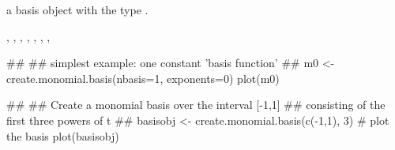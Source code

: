 \begin{Value}
a basis object with the type .
\end{Value}
\begin{SeeAlso}\relax
{}, 
, 
, 
, 
, 
, 
, 
\end{SeeAlso}
\begin{Examples}
\begin{ExampleCode}
##
## simplest example: one constant 'basis function' 
##
m0 <- create.monomial.basis(nbasis=1, exponents=0)
plot(m0)

##
## Create a monomial basis over the interval [-1,1]
##  consisting of the first three powers of t
##
basisobj <- create.monomial.basis(c(-1,1), 3)
#  plot the basis
plot(basisobj)
\end{ExampleCode}
\end{Examples}

